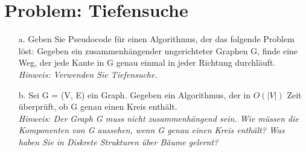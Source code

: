 \section{Problem: Tiefensuche}

\begin{enumerate}
	\item[a.] Geben Sie Pseudocode für einen Algorithmus, der das folgende Problem löst: Gegeben ein zusammenhängender ungerichteter Graphen G, finde eine Weg, der jede Kante in G genau einmal in jeder Richtung durchläuft.\\
	\textit{Hinweis: Verwenden Sie Tiefensuche.}
	
	\item[b.] Sei G = (V, E) ein Graph. Gegeben ein Algorithmus, der in $O(|V |)$ Zeit überprüft, ob G genau einen Kreis enthält.\\
	\textit{Hinweis: Der Graph G muss nicht zusammenhängend sein. Wie müssen die
	Komponenten von G aussehen, wenn G genau einen Kreis enthält? Was haben Sie in Diskrete Strukturen über Bäume gelernt?}
\end{enumerate}